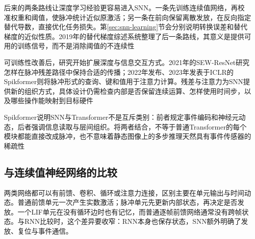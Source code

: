 后来的两条路线让深度学习经验更容易进入SNN。一条先训练连续值网络，再校准权重和阈值，使脉冲统计近似原激活；另一条在前向保留离散发放，在反向指定替代导数，直接优化任务损失。第\ref{sec:snn-learning}节会分别说明转换误差和替代梯度的近似性质。2019年的替代梯度综述系统整理了后一条路线，其意义是提供可用的训练信号，而不是消除阈值的不连续性

可训练性改善后，研究开始扩展深度与信息交互方式。2021年的SEW-ResNet研究怎样在脉冲残差路径中保持合适的传播；2022年发布、2023年发表于ICLR的Spikformer则将脉冲形式的查询、键和值用于注意力计算。残差与注意力为SNN提供新的组织方式，具体设计仍需检查内部是否保留连续运算、怎样使用时间步，以及哪些操作能映射到目标硬件

Spikformer说明SNN与Transformer不是互斥类别：前者规定事件编码和神经元动态，后者强调信息读取与层间组织。将两者结合，不等于普通Transformer的每个模块都能直接改成脉冲，也不意味着静态图像上的多步推理天然具有事件传感器的稀疏性

\subsection{与连续值神经网络的比较}
\label{sec:snn-ann-comparison}

两类网络都可以有前馈、卷积、循环或注意力连接，区别主要在单元输出与时间动态。普通前馈单元一次产生实数激活；脉冲单元先更新内部状态，再决定是否发放。一个LIF单元在没有循环边时也有记忆，而普通逐帧前馈网络通常没有跨帧状态。与RNN比较时，这个差异要收窄：RNN本身也保存状态，SNN额外明确了发放、复位与事件通信。

